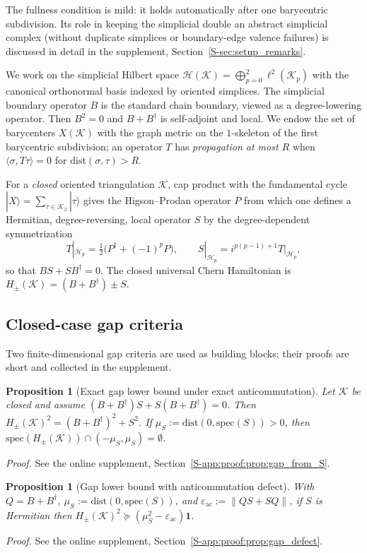 \documentclass[11pt]{article}
\numberwithin{equation}{section}
\newtheorem{proposition}[theorem]{Proposition}
\theoremstyle{definition}
\theoremstyle{remark}
\newcommand{\proofsuppref}[1]{%
  \par\noindent\emph{Proof.} See the online supplement, Section~\ref{S-#1}.\par\medskip
}
\newcommand{\K}{\mathcal{K}}
\newcommand{\Hil}{\mathcal{H}}
\newcommand{\Id}{\mathbf{1}}
\newcommand{\spec}{\mathrm{spec}}
\newcommand{\dist}{\mathrm{dist}}
\newcommand{\opnorm}[1]{\left\lVert#1\right\rVert}
\newcommand{\e}{\varepsilon}
\begin{document}
The fullness condition is mild: it holds automatically after one barycentric subdivision. Its
role in keeping the simplicial double an abstract simplicial complex (without duplicate simplices
or boundary-edge valence failures) is discussed in detail in the supplement,
Section~\ref{S-sec:setup_remarks}.

We work on the simplicial Hilbert space
\(\Hil(\K)=\bigoplus_{p=0}^2 \ell^2(\K_p)\)
with the canonical orthonormal basis indexed by oriented simplices. The simplicial boundary
operator $B$ is the standard chain boundary, viewed as a degree-lowering operator. Then
$B^2=0$ and $B+B^\dagger$ is self-adjoint and local. We endow the set of barycenters
$X(\K)$ with the graph metric on the $1$-skeleton of the first barycentric subdivision; an
operator $T$ has \emph{propagation at most $R$} when
$\langle\sigma,T\tau\rangle=0$ for $\dist(\sigma,\tau)>R$.

For a \emph{closed} oriented triangulation $\K$, cap product with the fundamental cycle
$|X\rangle=\sum_{\tau\in\K_2}|\tau\rangle$ gives the Higson--Prodan operator $P$ from which one
defines a Hermitian, degree-reversing, local operator $S$ by the degree-dependent
symmetrization
\[
T|_{\Hil_p}=\tfrac12\bigl(P^\dagger+(-1)^pP\bigr),\qquad
S|_{\Hil_p}=i^{p(p-1)+1}T|_{\Hil_p},
\]
so that $BS+SB^\dagger=0$. The closed universal Chern Hamiltonian is
\(H_\pm(\K)=(B+B^\dagger)\pm S\).

\subsection{Closed-case gap criteria}
Two finite-dimensional gap criteria are used as building blocks; their proofs are short and
collected in the supplement.

\begin{proposition}[Exact gap lower bound under exact anticommutation]\label{prop:gap_from_S}
Let $\K$ be closed and assume $(B+B^\dagger)S+S(B+B^\dagger)=0$. Then
$H_\pm(\K)^2=(B+B^\dagger)^2+S^2$. If $\mu_S:=\dist(0,\spec(S))>0$, then
$\spec(H_\pm(\K))\cap(-\mu_S,\mu_S)=\emptyset$.
\end{proposition}
\proofsuppref{app:proof:prop:gap_from_S}

\begin{proposition}[Gap lower bound with anticommutation defect]\label{prop:gap_defect}
With $Q=B+B^\dagger$, $\mu_S:=\dist(0,\spec(S))$, and $\e_{\mathrm{ac}}:=\opnorm{QS+SQ}$, if
$S$ is Hermitian then $H_\pm(\K)^2\succeq(\mu_S^2-\e_{\mathrm{ac}})\Id$.
\end{proposition}
\proofsuppref{app:proof:prop:gap_defect}
\end{document}
